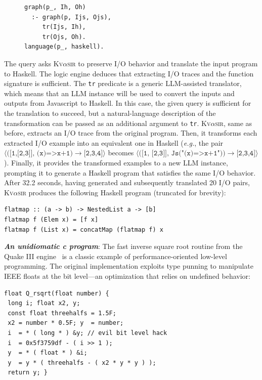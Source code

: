 \documentclass[nonacm,sigplan,review]{acmart}
\def\eg{{\em e.g.}, }
\newcommand{\sys}{{\scshape Kv{$\alpha$}sir}\xspace}
\newcommand{\heading}[1]{\vspace{2pt}\noindent\textbf{\emph{#1}}:\enspace}
\newcommand{\ttt}[1]{\texttt{#1}\xspace}
\begin{document}
\begin{figure}
\begin{verbatim}
graph(p_, Ih, Oh) 
  :- graph(p, Ijs, Ojs),
     tr(Ijs, Ih),
     tr(Ojs, Oh).
language(p_, haskell).
\end{verbatim}
\end{figure}
The query asks \sys to preserve I/O behavior and translate the input program to Haskell.
The logic engine deduces that extracting I/O traces and the function signature is
sufficient.
The \ttt{tr} predicate is a generic LLM-assisted translator, which 
means that an LLM instance will be used to convert the inputs and outputs from Javascript 
to Haskell.
In this case, the given query is sufficient for the translation to succeed, 
but a natural-language description of the transformation can be passed as an additional 
argument to \ttt{tr}.
\sys, same as before, extracts an I/O trace from the original program.
Then, it transforms each extracted I/O example into an equivalent one in Haskell (\eg 
the pair $\langle\ttt{([1,[2,3]], (x)=>x+1)}\to\ttt{[2,3,4]}\rangle$ 
becomes $\langle(\ttt{[1, [2,3]], Js("(x)=>x+1"))}\to\ttt{[2,3,4]}\rangle$).
Finally, it provides the transformed examples to a new LLM instance, prompting it
to generate a Haskell program that satisfies the same I/O behavior.
After 32.2 seconds, having generated and subsequently translated 20 I/O pairs,
\sys produces the following Haskell program (truncated for brevity):
\begin{verbatim}
flatmap :: (a -> b) -> NestedList a -> [b]
flatmap f (Elem x) = [f x]
flatmap f (List x) = concatMap (flatmap f) x
\end{verbatim}

\heading{An unidiomatic c program}
The fast inverse square root routine from the Quake III
engine~\cite{fast_inv_sqrt}
is a classic example of performance-oriented low-level programming.
The original implementation exploits type punning to manipulate IEEE
floats at the bit level---an optimization that relies on undefined behavior:

\begin{verbatim}
float Q_rsqrt(float number) {
 long i; float x2, y;
 const float threehalfs = 1.5F;
 x2 = number * 0.5F; y  = number;
 i  = * ( long * ) &y; // evil bit level hack
 i  = 0x5f3759df - ( i >> 1 );
 y  = * ( float * ) &i;
 y  = y * ( threehalfs - ( x2 * y * y ) );
 return y; }
\end{verbatim}
\end{document}
